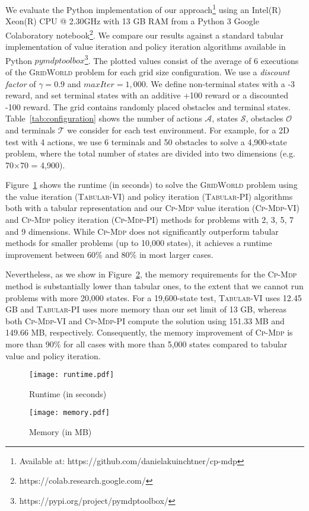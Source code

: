 \documentclass[letterpaper]{article} %
\newcommand\gridworld{\textsc{GridWorld}}
\newcommand\cpmdp{\textsc{Cp-Mdp}}
\newcommand\tabularpi{\textsc{Tabular-PI}}
\newcommand\tabularvi{\textsc{Tabular-VI}}
\newcommand\cpmdppi{\textsc{Cp-Mdp-PI}}
\newcommand\cpmdpvi{\textsc{Cp-Mdp-VI}}
\begin{document}
We evaluate the Python implementation of our approach\footnote{Available at: https://github.com/danielakuinchtner/cp-mdp} 
using an Intel(R) Xeon(R) CPU @ 2.30GHz with 13 GB RAM from a Python 3 Google Colaboratory notebook\footnote{https://colab.research.google.com/}.
We compare our results against a standard tabular implementation of value iteration and policy iteration algorithms available in Python $pymdptoolbox$\footnote{https://pypi.org/project/pymdptoolbox/}. 
The plotted values consist of the average of 6 executions of the \gridworld{} problem for each grid size configuration.
We use a \emph{discount factor} of $\gamma = 0.9$ and $maxIter = 1,000$. We define non-terminal states with a -3 reward, and set terminal states with an additive +100 reward or a discounted -100 reward.
The grid contains randomly placed obstacles and terminal states.
% 
Table~\ref{tab:configuration} shows the number of actions $\mathcal{A}$, states $\mathcal{S}$, obstacles $\mathcal{O}$ and terminals $\mathcal{T}$ we consider for each test environment. 
For example, for a 2D test with 4 actions, we use 6 terminals and 50 obstacles to solve a 4,900-state problem, where the total number of states are divided into two dimensions (e.g. 70$\times$70 = 4,900). 


Figure~\ref{fig:runtime} shows the runtime (in seconds) to solve the \gridworld{} problem using the value iteration (\tabularvi{}) and policy iteration (\tabularpi{}) algorithms both with a tabular representation and our \cpmdp{} value iteration (\cpmdpvi{}) and \cpmdp{} policy iteration (\cpmdppi{}) methods for problems with 2, 3, 5, 7 and 9 dimensions. 
While \cpmdp{} does not significantly outperform tabular methods for smaller problems (up to 10,000 states), it achieves a runtime improvement between 60\% and 80\% in most larger cases. 

Nevertheless, as we show in Figure~\ref{fig:memory}, the memory requirements for the \cpmdp{} method is substantially lower than tabular ones, to the extent that we cannot run problems with more 20,000 states. 
For a 19,600-state test, \tabularvi{} uses 12.45 GB and  \tabularpi{} uses more memory than our set limit of 13 GB, whereas both \cpmdpvi{} and \cpmdppi{} compute the solution using 151.33 MB and 149.66 MB, respectively. 
Consequently, the memory improvement of \cpmdp{} is more than 90\% for all cases with more than 5,000 states compared to tabular value and policy iteration. 
\begin{figure*}[htb]
 \centering
 \begin{subfigure}[]{0.48\textwidth}
 \centering
 \texttt{[image: runtime.pdf]}
 \caption{Runtime (in seconds)}
 \label{fig:runtime}
 \end{subfigure}
 \begin{subfigure}[]{0.48\textwidth}
 \centering
 \texttt{[image: memory.pdf]}
 \caption{Memory (in MB)}
 \label{fig:memory}
 \end{subfigure}
 \caption{(a) Runtime (in seconds) and (b) memory (in MB) of \cpmdpvi{} and \cpmdppi{} methods against the tabular value iteration (\tabularvi{}) and policy iteration (\tabularpi{}) algorithms of 2, 3, 5, 7 and 9 dimensions.}
 \label{fig:memory-runtime}
\end{figure*}
\end{document}
